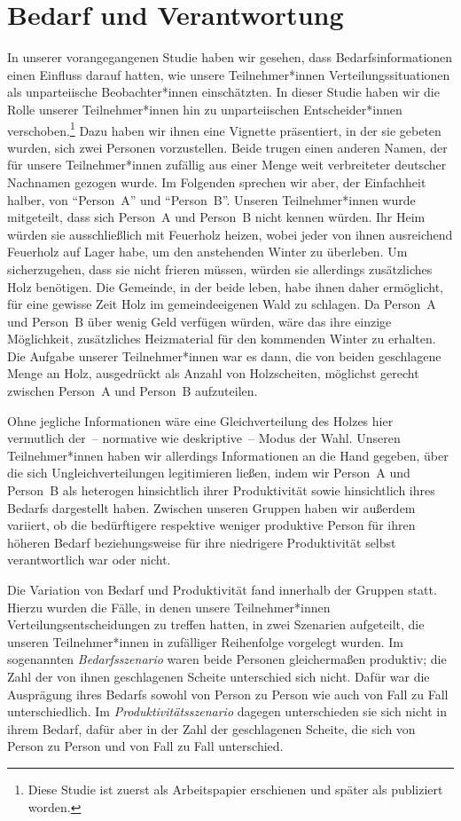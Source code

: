 \documentclass[justified,nobib,nohyper,symmetric,twoside]{tufte-book}
\begin{document}
\chapter{Bedarf und Verantwortung}\label{ch:verantwortung}
In unserer vorangegangenen Studie haben wir gesehen, dass Bedarfsinformationen einen Einfluss darauf hatten, wie unsere Teilnehmer*innen Verteilungssituationen als unparteiische Beobachter*innen einschätzten.
In dieser Studie haben wir die Rolle unserer Teilnehmer*innen hin zu unparteiischen Entscheider*innen verschoben.\footnote{Diese Studie ist zuerst als Arbeitspapier erschienen \citep{bauer_need_2020} und später als \citet{bauer_need_2022} publiziert worden.}
Dazu haben wir ihnen eine Vignette präsentiert, in der sie gebeten wurden, sich zwei Personen vorzustellen.
Beide trugen einen anderen Namen, der für unsere Teilnehmer*innen zufällig aus einer Menge weit verbreiteter deutscher Nachnamen gezogen wurde.
Im Folgenden sprechen wir aber, der Einfachheit halber, von \enquote{Person~A} und \enquote{Person~B}.
Unseren Teilnehmer*innen wurde mitgeteilt, dass sich Person~A und Person~B nicht kennen würden.
Ihr Heim würden sie ausschließlich mit Feuerholz heizen, wobei jeder von ihnen ausreichend Feuerholz auf Lager habe, um den anstehenden Winter zu überleben.
Um sicherzugehen, dass sie nicht frieren müssen, würden sie allerdings zusätzliches Holz benötigen.
Die Gemeinde, in der beide leben, habe ihnen daher ermöglicht, für eine gewisse Zeit Holz im gemeindeeigenen Wald zu schlagen.
Da Person~A und Person~B über wenig Geld verfügen würden, wäre das ihre einzige Möglichkeit, zusätzliches Heizmaterial für den kommenden Winter zu erhalten.
Die Aufgabe unserer Teilnehmer*innen war es dann, die von beiden geschlagene Menge an Holz, ausgedrückt als Anzahl von Holzscheiten, möglichst gerecht zwischen Person~A und Person~B aufzuteilen.

Ohne jegliche Informationen wäre eine Gleichverteilung des Holzes hier vermutlich der~-- normative wie deskriptive~-- Modus der Wahl.
Unseren Teilnehmer*innen haben wir allerdings Informationen an die Hand gegeben, über die sich Ungleichverteilungen legitimieren ließen, indem wir Person~A und Person~B als heterogen hinsichtlich ihrer Produktivität sowie hinsichtlich ihres Bedarfs dargestellt haben.
Zwischen unseren Gruppen haben wir außerdem variiert, ob die bedürftigere respektive weniger produktive Person für ihren höheren Bedarf beziehungsweise für ihre niedrigere Produktivität selbst verantwortlich war oder nicht.

Die Variation von Bedarf und Produktivität fand innerhalb der Gruppen statt.
Hierzu wurden die Fälle, in denen unsere Teilnehmer*innen Verteilungsentscheidungen zu treffen hatten, in zwei Szenarien aufgeteilt, die unseren Teilnehmer*innen in zufälliger Reihenfolge vorgelegt wurden.
Im sogenannten \textit{Bedarfsszenario} waren beide Personen gleichermaßen produktiv; die Zahl der von ihnen geschlagenen Scheite unterschied sich nicht.
Dafür war die Ausprägung ihres Bedarfs sowohl von Person zu Person wie auch von Fall zu Fall unterschiedlich.
Im \textit{Produktivitätsszenario} dagegen unterschieden sie sich nicht in ihrem Bedarf, dafür aber in der Zahl der geschlagenen Scheite, die sich von Person zu Person und von Fall zu Fall unterschied.
\end{document}
